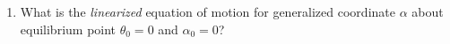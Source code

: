 \documentclass[12pt]{report}
\newcommand\drew[1]{\textcolor{red}{#1}}
\newcommand{\pder}[2]{\frac{\partial #1}{\partial #2}}
\begin{document}
\begin{enumerate}
    \item What is the \emph{linearized} equation of motion for generalized coordinate $\alpha$ about equilibrium point $\theta_0 = 0$ and $\alpha_0 = 0$?\\

\end{enumerate}
\end{document}

